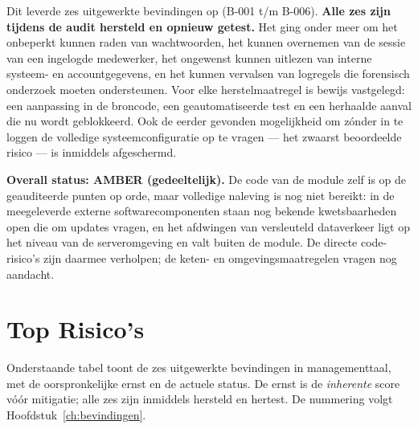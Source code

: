 \documentclass[12pt, a4paper]{report}
\newcommand{\amber}[1]{\textcolor{ragAmber}{\textbf{#1}}}
\begin{document}
Dit leverde zes uitgewerkte bevindingen op (B-001 t/m B-006). \textbf{Alle zes
zijn tijdens de audit hersteld en opnieuw getest.} Het ging onder meer om het
onbeperkt kunnen raden van wachtwoorden, het kunnen overnemen van de sessie
van een ingelogde medewerker, het ongewenst kunnen uitlezen van interne
systeem- en accountgegevens, en het kunnen vervalsen van logregels die
forensisch onderzoek moeten ondersteunen. Voor elke herstelmaatregel is bewijs
vastgelegd: een aanpassing in de broncode, een geautomatiseerde test en een
herhaalde aanval die nu wordt geblokkeerd. Ook de eerder gevonden mogelijkheid
om zónder in te loggen de volledige systeemconfiguratie op te vragen --- het
zwaarst beoordeelde risico --- is inmiddels afgeschermd.

\textbf{Overall status: \amber{AMBER (gedeeltelijk)}.} De code van de module
zelf is op de geauditeerde punten op orde, maar volledige naleving is nog niet
bereikt: in de meegeleverde externe softwarecomponenten staan nog bekende
kwetsbaarheden open die om updates vragen, en het afdwingen van versleuteld
dataverkeer ligt op het niveau van de serveromgeving en valt buiten de module.
De directe code-risico's zijn daarmee verholpen; de keten- en
omgevingsmaatregelen vragen nog aandacht.

\section{Top Risico's}
\label{sec:top-risicos}

Onderstaande tabel toont de zes uitgewerkte bevindingen in managementtaal, met
de oorspronkelijke ernst en de actuele status. De ernst is de \emph{inherente}
score vóór mitigatie; alle zes zijn inmiddels hersteld en hertest. De nummering
volgt Hoofdstuk~\ref{ch:bevindingen}.
\end{document}
